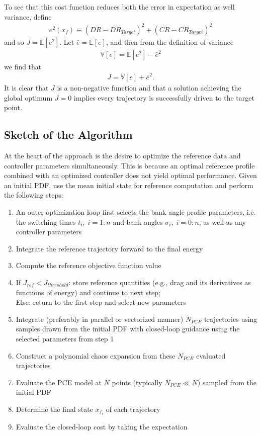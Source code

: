 \documentclass[10pt,a4paper]{article}
\begin{document}
	To see that this cost function reduces both the error in expectation as well variance, define
	\begin{align}
	e^2(x_f) \equiv (DR-DR_{Target})^2 + (CR-CR_{Target})^2
	\end{align}
	and so $	J = \mathbb{E}[e^2]$. Let $\bar{e} = \mathbb{E}[e]$, and then from the definition of variance
	\begin{align}
	\mathbb{V}[e] = \mathbb{E}[e^2] - \bar{e}^2
	\end{align}
	we find that 
		\begin{align}
		J = \mathbb{V}[e] + \bar{e}^2.
		\end{align}
	It is clear that $ J $ is a non-negative function and that a solution achieving the global optimum $ J=0 $ implies every trajectory is successfully driven to the target point.
	\subsection{Sketch of the Algorithm}
	At the heart of the approach is the desire to optimize the reference data and controller parameters simultaneously. This is because an optimal reference profile combined with an optimized controller does not yield optimal performance. Given an initial PDF, use the mean initial state for reference computation and perform the following steps:
	\begin{enumerate}
		\item An outer optimization loop first selects the bank angle profile parameters, i.e. the switching times $t_i,\;i=1:n$ and bank angles $\sigma_i,\;i=0:n$, as well as any controller parameters
		\item Integrate the reference trajectory forward to the final energy
		\item Compute the reference objective function value
		\item If $ J_{ref} < J_{threshold} $: store reference quantities (e.g., drag and its derivatives as functions of energy) and continue to next step;\\
		Else: return to the first step and select new parameters
		\item Integrate (preferably in parallel or vectorized manner) $ N_{PCE} $ trajectories using samples drawn from the initial PDF with closed-loop guidance using the selected parameters from step 1
		\item Construct a polynomial chaos expansion from these $ N_{PCE} $ evaluated trajectories
		\item Evaluate the PCE model at $ N $ points (typically $N_{PCE}\ll N $) sampled from the initial PDF
		\item Determine the final state $x_{f_i}$ of each trajectory
		\item Evaluate the closed-loop cost by taking the expectation
	\end{enumerate}
		
\end{document}
